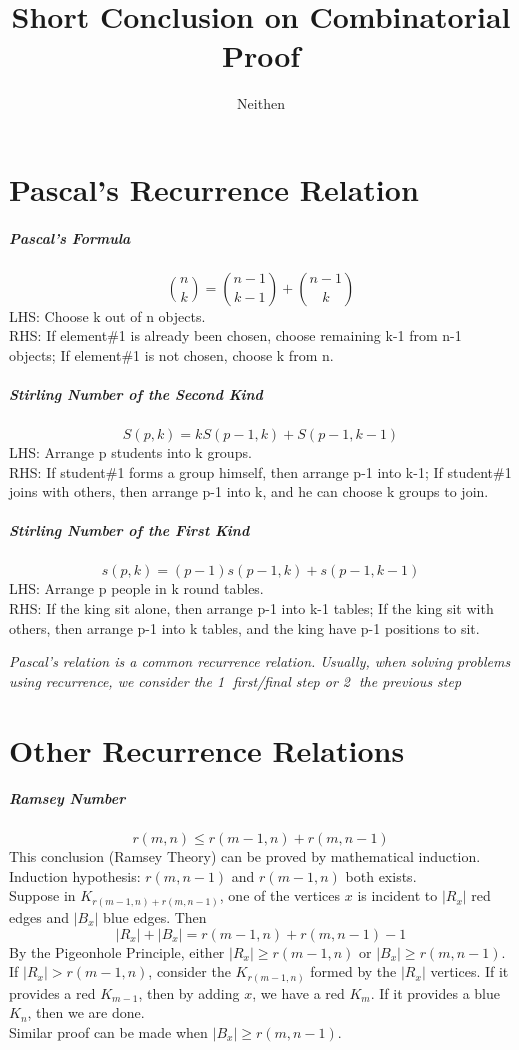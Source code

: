 \documentclass{article}
\title{Short Conclusion on Combinatorial Proof}
\author{Neithen}
\begin{document}
	\maketitle
	
	\section{Pascal's Recurrence Relation}
	\subparagraph{Pascal's Formula}
	$${n \choose k} = {n-1 \choose k-1} + {n-1 \choose k}$$
	LHS: Choose k out of n objects.\\
	RHS: If element\#1 is already been chosen, choose remaining k-1 from n-1 objects; If element\#1 is not chosen, choose k from n.
	
	\subparagraph{Stirling Number of the Second Kind}
	$$S(p,k)=kS(p-1,k)+S(p-1,k-1)$$
	LHS: Arrange p students into k groups.\\
	RHS: If student\#1 forms a group himself, then arrange p-1 into k-1; If student\#1 joins with others, then arrange p-1 into k, and he can choose k groups to join.
	
	\subparagraph{Stirling Number of the First Kind}
	$$s(p,k)=(p-1)s(p-1,k)+s(p-1,k-1)$$
	LHS: Arrange p people in k round tables.\\
	RHS: If the king sit alone, then arrange p-1 into k-1 tables; If the king sit with others, then arrange p-1 into k tables, and the king have p-1 positions to sit.
	
	\textit{Pascal's relation is a common recurrence relation. Usually, when solving problems using recurrence, we consider the \textcircled{1} first/final step or \textcircled{2} the previous step}
	
	\section{Other Recurrence Relations}
	\subparagraph{Ramsey Number}
	$$r(m,n)\leq r(m-1,n)+r(m,n-1)$$
	This conclusion (Ramsey Theory) can be proved by mathematical induction.\\
	Induction hypothesis: $r(m,n-1)$ and $r(m-1,n)$ both exists.\\
	Suppose in $K_{r(m-1,n)+r(m,n-1)}$, one of the vertices $x$ is incident to $|R_x|$ red edges and $|B_x|$ blue edges. Then
	$$ |R_x|+|B_x|=r(m-1,n)+r(m,n-1)-1$$
	By the Pigeonhole Principle, either $|R_x|\geq r(m-1,n)$ or $|B_x| \geq r(m,n-1)$.\\
	If $|R_x|>r(m-1,n)$, consider the $K_{r(m-1,n)}$ formed by the $|R_x|$ vertices. If it provides a red $K_{m-1}$, then by adding $x$, we have a red $K_m$. If it provides a blue $K_n$, then we are done.\\
	Similar proof can be made when $|B_x| \geq r(m,n-1)$.\\
	
\end{document}
